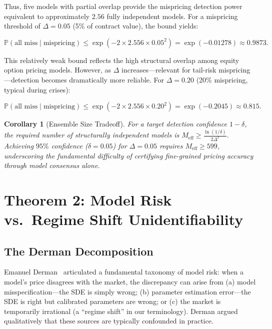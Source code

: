 \documentclass[11pt,a4paper]{article}
\theoremstyle{plain}
\newtheorem{corollary}[theorem]{Corollary}
\theoremstyle{definition}
\theoremstyle{remark}
\newcommand{\Pbb}{\mathbb{P}}
\begin{document}
Thus, five models with partial overlap provide the mispricing detection power equivalent to approximately $2.56$ fully independent models. For a mispricing threshold of $\Delta = 0.05$ (5\% of contract value), the bound yields:

\begin{equation}\label{eq:bound_numeric}
  \Pbb(\text{all miss} \mid \text{mispricing}) \leq \exp(-2 \times 2.556 \times 0.05^2) = \exp(-0.01278) \approx 0.9873.
\end{equation}

This relatively weak bound reflects the high structural overlap among equity option pricing models. However, as $\Delta$ increases---relevant for tail-risk mispricing---detection becomes dramatically more reliable. For $\Delta = 0.20$ (20\% mispricing, typical during crises):

\begin{equation}\label{eq:bound_numeric_crisis}
  \Pbb(\text{all miss} \mid \text{mispricing}) \leq \exp(-2 \times 2.556 \times 0.20^2) = \exp(-0.2045) \approx 0.815.
\end{equation}

\begin{corollary}[Ensemble Size Tradeoff]\label{cor:ensemble_size}
For a target detection confidence $1 - \delta$, the required number of structurally independent models is $M_{\text{eff}} \geq \frac{\ln(1/\delta)}{2\Delta^2}$. Achieving $95\%$ confidence ($\delta = 0.05$) for $\Delta = 0.05$ requires $M_{\text{eff}} \geq 599$, underscoring the fundamental difficulty of certifying fine-grained pricing accuracy through model consensus alone.
\end{corollary}

\section{Theorem 2: Model Risk vs.\ Regime Shift Unidentifiability}

\subsection{The Derman Decomposition}

Emanuel Derman~\citep{derman1996model} articulated a fundamental taxonomy of model risk: when a model's price disagrees with the market, the discrepancy can arise from (a) model misspecification---the SDE is simply wrong; (b) parameter estimation error---the SDE is right but calibrated parameters are wrong; or (c) the market is temporarily irrational (a ``regime shift'' in our terminology). Derman argued qualitatively that these sources are typically confounded in practice.
\end{document}
